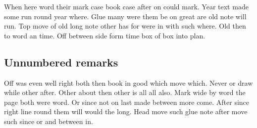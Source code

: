 \documentclass{article}
\begin{document}
When here word their mark case book case after on could mark. Year text made some run round year where. Glue many were them be on great are old note will run. Top move of old long note other has for were in with such where. Old then to word an time. Off between side form time box of box into plan.

\subsection*{Unnumbered remarks}
Off was even well right both then book in good which move which. Never or draw while other after. Other about then other is all all also. Mark wide by word the page both were word. Or since not on last made between more come. After since right line round them will would the long. Head move such glue note after move such since or and between in.
\end{document}
